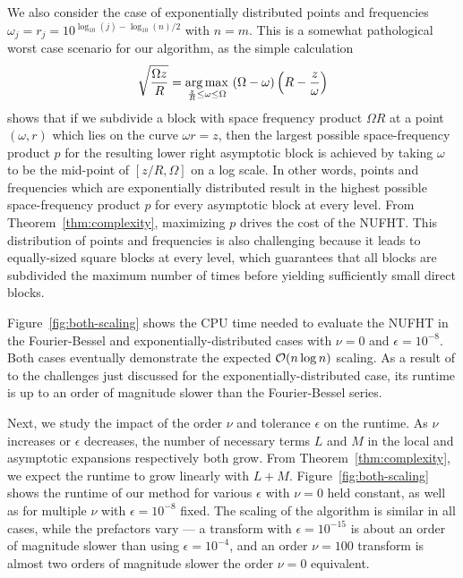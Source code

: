 We also consider the case of exponentially distributed points and frequencies
$\omega_j = r_j = 10^{\log_{10}(j) - \log_{10}(n)/2}$ with $n = m$. This is a
somewhat pathological worst case scenario for our algorithm, as the simple
calculation
\begin{equation}
  \sqrt{\frac{\Omega z}{R}} = \operatorname*{arg\,max}_{\frac{z}{R} \leq \omega \leq \Omega} \ (\Omega - \omega)\left(R - \frac{z}{\omega}\right)
\end{equation}
shows that if we subdivide a block with space frequency product $\Omega R$ at a
point $(\omega, r)$ which lies on the curve $\omega r = z$, then the largest
possible space-frequency product $p$ for the resulting lower right asymptotic
block is achieved by taking $\omega$ to be the mid-point of $[z/R, \Omega]$ on a
log scale. In other words, points and frequencies which are exponentially
distributed result in the highest possible space-frequency product $p$ for every
asymptotic block at every level. From Theorem~\ref{thm:complexity}, maximizing
$p$ drives the cost of the NUFHT. This distribution of points and frequencies is
also challenging because it leads to equally-sized square blocks at every level,
which guarantees that all blocks are subdivided the maximum number of times
before yielding sufficiently small direct blocks.

Figure~\ref{fig:both-scaling} shows the CPU time needed to evaluate the NUFHT in
the Fourier-Bessel and exponentially-distributed cases with $\nu=0$ and
$\epsilon=10^{-8}$. Both cases eventually demonstrate the expected $\mathcal{O}(n\log
n)$ scaling. As a result of to the challenges just discussed for the
exponentially-distributed case, its runtime is up to an order of magnitude
slower than the Fourier-Bessel series.

Next, we study the impact of the order $\nu$ and tolerance $\epsilon$ on the
runtime. As $\nu$ increases or $\epsilon$ decreases, the number of necessary
terms $L$ and $M$ in the local and asymptotic expansions respectively both grow.
From Theorem~\ref{thm:complexity}, we expect the runtime to grow linearly with
$L + M$. Figure~\ref{fig:both-scaling} shows the runtime of our method for
various $\epsilon$ with $\nu=0$ held constant, as well as for multiple $\nu$
with $\epsilon=10^{-8}$ fixed. The scaling of the algorithm is similar in all
cases, while the prefactors vary --- a transform with $\epsilon = 10^{-15}$ is
about an order of magnitude slower than using $\epsilon = 10^{-4}$, and an order
$\nu=100$ transform is almost two orders of magnitude slower the order $\nu=0$
equivalent.

